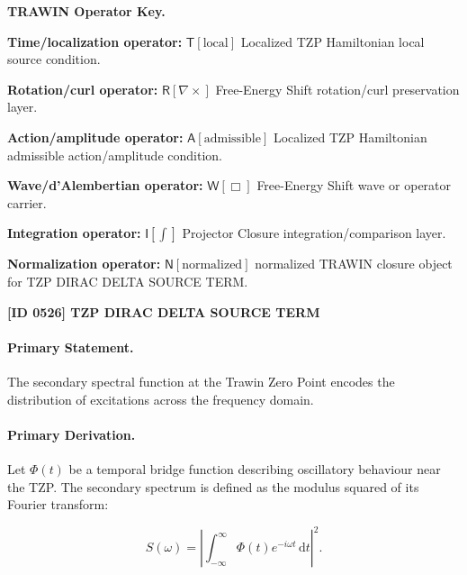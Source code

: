 \par\vspace{0.45\baselineskip}
\noindent\begin{minipage}[t]{\linewidth}
\begingroup
\small
\raggedright
\textbf{TRAWIN Operator Key.}\par
\noindent\textbf{Time/localization operator:} $\mathsf{T}\!\left[\mathrm{local}\right]$ Localized TZP Hamiltonian local source condition.\par
\noindent\textbf{Rotation/curl operator:} $\mathsf{R}\!\left[\nabla\times\right]$ Free-Energy Shift rotation/curl preservation layer.\par
\noindent\textbf{Action/amplitude operator:} $\mathsf{A}\!\left[\mathrm{admissible}\right]$ Localized TZP Hamiltonian admissible action/amplitude condition.\par
\noindent\textbf{Wave/d'Alembertian operator:} $\mathsf{W}\!\left[\Box\right]$ Free-Energy Shift wave or operator carrier.\par
\noindent\textbf{Integration operator:} $\mathsf{I}\!\left[\int\right]$ Projector Closure integration/comparison layer.\par
\noindent\textbf{Normalization operator:} $\mathsf{N}\!\left[\mathrm{normalized}\right]$ normalized TRAWIN closure object for TZP DIRAC DELTA SOURCE TERM.\par
\endgroup
\end{minipage}

\clearpage
\noindent\textbf{[ID 0526] TZP DIRAC DELTA SOURCE TERM}\par
\vspace{0.35em}
\paragraph{Primary Statement.}

The secondary spectral function at the Trawin Zero Point encodes the distribution of excitations across the frequency domain.

\paragraph{Primary Derivation.}

Let $\Phi(t)$ be a temporal bridge function describing oscillatory behaviour near the TZP.
The secondary spectrum is defined as the modulus squared of its Fourier transform:

\begin{equation}
S(\omega) = \left| \int_{-\infty}^{\infty} \Phi(t) e^{-i\omega t} \, \mathrm{d}t \right|^2 .
\end{equation}

